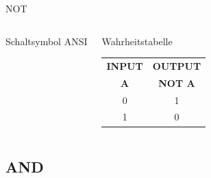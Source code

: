 \begin{frame}{NOT}
\begin{columns}
    {\small Schaltsymbol ANSI}
    \begin{block}{Wahrheitstabelle}
      \begin{tabular}{c|c}
        \textbf{INPUT} & \textbf{OUTPUT} \\
        \textbf{A} & \textbf{NOT A} \\ \hline
        0 & 1 \\
        1 & 0 \\
      \end{tabular}
    \end{block}
  \end{columns}
\end{frame}

\subsection{AND}

